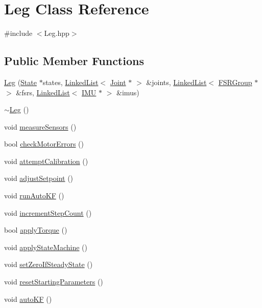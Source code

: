 \hypertarget{classLeg}{}\section{Leg Class Reference}
\label{classLeg}


{\ttfamily \#include $<$Leg.\+hpp$>$}

\subsection*{Public Member Functions}
\begin{DoxyCompactItemize}
\item 
\hyperlink{classLeg_a6d5b28eb9654994965bcfdbf9923ff23}{Leg} (\hyperlink{classState}{State} $\ast$states, \hyperlink{classLinkedList}{Linked\+List}$<$ \hyperlink{classJoint}{Joint} $\ast$ $>$ \&joints, \hyperlink{classLinkedList}{Linked\+List}$<$ \hyperlink{classFSRGroup}{F\+S\+R\+Group} $\ast$ $>$ \&fsrs, \hyperlink{classLinkedList}{Linked\+List}$<$ \hyperlink{classIMU}{I\+MU} $\ast$ $>$ \&imus)
\item 
\hyperlink{classLeg_ae8681a2d65842a5665e14a27d05e2269}{$\sim$\+Leg} ()
\item 
void \hyperlink{classLeg_a8f7c54d2d11a119d8450d913cc350142}{measure\+Sensors} ()
\item 
bool \hyperlink{classLeg_ae78b8472ac3715c6884a5a20b29b2bd3}{check\+Motor\+Errors} ()
\item 
void \hyperlink{classLeg_a224e77111da7e058fe78c303831039ea}{attempt\+Calibration} ()
\item 
void \hyperlink{classLeg_a7186f2ae6bc0498b85c304125d10f95c}{adjust\+Setpoint} ()
\item 
void \hyperlink{classLeg_a91aeace1a207588ed2ee381de3e15bca}{run\+Auto\+KF} ()
\item 
void \hyperlink{classLeg_af9e1c41b81595063edfa2c8b1b91868b}{increment\+Step\+Count} ()
\item 
bool \hyperlink{classLeg_a649070f138eead80a820a29bbe0f7959}{apply\+Torque} ()
\item 
void \hyperlink{classLeg_ac2b402d4f61e692797d548d70e1f992b}{apply\+State\+Machine} ()
\item 
void \hyperlink{classLeg_a27223f58b6b0b20cf691251dde86f015}{set\+Zero\+If\+Steady\+State} ()
\item 
void \hyperlink{classLeg_a4cc3d9df26638c77b5e827eefb03eadb}{reset\+Starting\+Parameters} ()
\item 
void \hyperlink{classLeg_afc669943b31b0fe0d19dc9da140ff2b9}{auto\+KF} ()

\end{DoxyCompactItemize}
